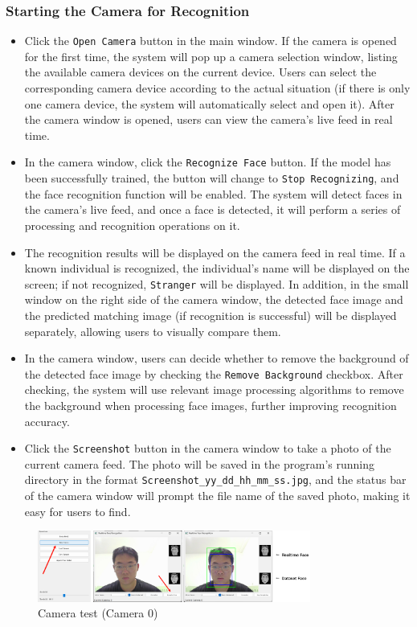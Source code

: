 \documentclass{article}
\begin{document}
\subsubsection{Starting the Camera for Recognition}
\begin{itemize}
    \item Click the \texttt{Open Camera} button in the main window. If the camera is opened for the first time, the system will pop up a camera selection window, listing the available camera devices on the current device. Users can select the corresponding camera device according to the actual situation (if there is only one camera device, the system will automatically select and open it). After the camera window is opened, users can view the camera's live feed in real time.
    \item In the camera window, click the \texttt{Recognize Face} button. If the model has been successfully trained, the button will change to \texttt{Stop Recognizing}, and the face recognition function will be enabled. The system will detect faces in the camera's live feed, and once a face is detected, it will perform a series of processing and recognition operations on it.
    \item The recognition results will be displayed on the camera feed in real time. If a known individual is recognized, the individual's name will be displayed on the screen; if not recognized, \texttt{Stranger} will be displayed. In addition, in the small window on the right side of the camera window, the detected face image and the predicted matching image (if recognition is successful) will be displayed separately, allowing users to visually compare them.
    \item In the camera window, users can decide whether to remove the background of the detected face image by checking the \texttt{Remove Background} checkbox. After checking, the system will use relevant image processing algorithms to remove the background when processing face images, further improving recognition accuracy.
    \item Click the \texttt{Screenshot} button in the camera window to take a photo of the current camera feed. The photo will be saved in the program's running directory in the format \texttt{Screenshot\_yy\_dd\_hh\_mm\_ss.jpg}, and the status bar of the camera window will prompt the file name of the saved photo, making it easy for users to find.
\end{itemize}

\begin{figure}[H]
    \centering
    \includegraphics[width=0.8\textwidth]{Img/PixPin_2025-03-09_00-59-57.png}
    \caption{Camera test (Camera 0)}
\end{figure}
\end{document}
